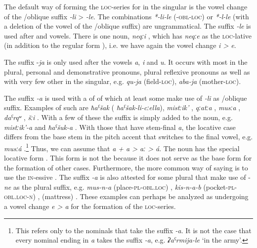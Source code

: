 The default way of forming the \textsc{loc}-series for  in the singular is the vowel change of the \slash oblique suffix \textit{-li} > \textit{-le}. The combinations \textit{*-li-le} \linebreak (\textsc{-obl-loc}) or \textit{*-l-le} (with a deletion of the vowel of the  \slash oblique suffix) are ungrammatical. The suffix \textit{-le} is used after  and vowels. There is one noun, \textit{neqːi} , which has \textit{neqːe} as the \textsc{loc}-lative (in addition to the regular form ), i.e. we have again the vowel change \textit{i > e}. 

The suffix -\textit{ja} is only used after the vowels \textit{a}, \textit{i} and \textit{u}. It occurs with most  in the plural, personal and demonstrative pronouns, plural reflexive pronouns as well as with very few other  in the singular, e.g. \textit{qu-ja} (field-\textsc{loc}), \textit{aba-ja} (mother-\textsc{loc}). 

The suffix \textit{-a} is used with a  of  of which at least some make use of \textit{-li} as \slash oblique suffix. Examples of such  are \textit{ħaˁšak}   ( \textit{ħaˁšak-li-cːella}), \textit{mistːik'} , \textit{qːatːa} , \textit{musːa} , \textit{daˁrqʷ} , \textit{šːi} . With a few of these  the suffix is simply added to the noun, e.g. \textit{mistːik'-a}  and \textit{ħaˁšuk-a} . With those  that have stem-final \textit{a}, the locative case differs from the base stem in the pitch accent that switches to the final vowel, e.g. \textit{musːá}  .\footnote{This refers only to the nominals that take the suffix \textit{-a}. It is not the case that every nominal ending in \textit{a} takes the suffix \textit{-a}, e.g. \textit{ʡaˁrmija-le} `in the army'.} Thus, we can assume that \textit{a + a > aː > á}. The noun  has the special locative form  . This form is not the  because it does not serve as the base form for the formation of other cases. Furthermore, the more common way of saying  is to use the \textsc{in}-essive . The suffix \textit{-a} is also attested for some plural  that make use of -\textit{ne} as the plural suffix, e.g. \textit{mus-n-a} (place-\textsc{pl}-\textsc{obl}.\textsc{loc}) , \textit{kis-n-a-b} (pocket-\textsc{pl}-\textsc{obl}.\textsc{loc}-\textsc{n}) ,  (mattress) . These examples can perhaps be analyzed as undergoing a vowel change \textit{e > a} for the formation of the \textsc{loc}-series.

